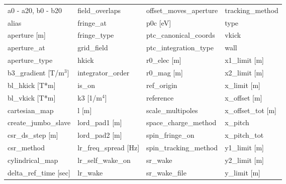  \begin{tabular}{llll} \toprule
a0 - a20, b0 - b20               & field_overlaps                   & offset_moves_aperture            & tracking_method                  \\
alias                            & fringe_at                        & p0c [eV]                         & type                             \\
aperture [m]                     & fringe_type                      & ptc_canonical_coords             & vkick                            \\
aperture_at                      & grid_field                       & ptc_integration_type             & wall                             \\
aperture_type                    & hkick                            & r0_elec [m]                      & x1_limit [m]                     \\
b3_gradient [T/m$^3$]            & integrator_order                 & r0_mag [m]                       & x2_limit [m]                     \\
bl_hkick [T*m]                   & is_on                            & ref_origin                       & x_limit [m]                      \\
bl_vkick [T*m]                   & k3 [1/m$^4$]                     & reference                        & x_offset [m]                     \\
cartesian_map                    & l [m]                            & scale_multipoles                 & x_offset_tot [m]                 \\
create_jumbo_slave               & lord_pad1 [m]                    & space_charge_method              & x_pitch                          \\
csr_ds_step [m]                  & lord_pad2 [m]                    & spin_fringe_on                   & x_pitch_tot                      \\
csr_method                       & lr_freq_spread [Hz]              & spin_tracking_method             & y1_limit [m]                     \\
cylindrical_map                  & lr_self_wake_on                  & sr_wake                          & y2_limit [m]                     \\
delta_ref_time [sec]             & lr_wake                          & sr_wake_file                     & y_limit [m]                      \\

\end{tabular}
